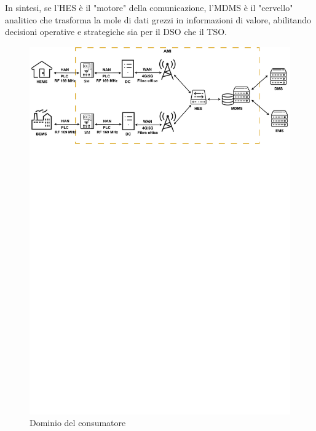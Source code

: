 




In sintesi, se l'HES è il "motore" della comunicazione, l'MDMS è il "cervello" analitico che trasforma la mole di dati grezzi in informazioni di valore, abilitando decisioni operative e strategiche sia per il DSO che il TSO.


\begin{figure}[h!]
    \centering
    \includegraphics[trim= 0cm 61cm 0cm 0cm, clip, width=0.9\linewidth]{img/client-view-v2.drawio.pdf}
    \caption{Dominio del consumatore}
\end{figure}





